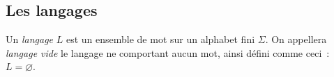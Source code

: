 





\subsection{Les langages}

\begin{definition}
    Un \textit{langage} \(L\) est un ensemble de mot sur un alphabet fini
    \(\Sigma\). On appellera \textit{langage vide} le langage ne comportant aucun
    mot, ainsi défini comme ceci~: \(L = \varnothing\).
\end{definition}


